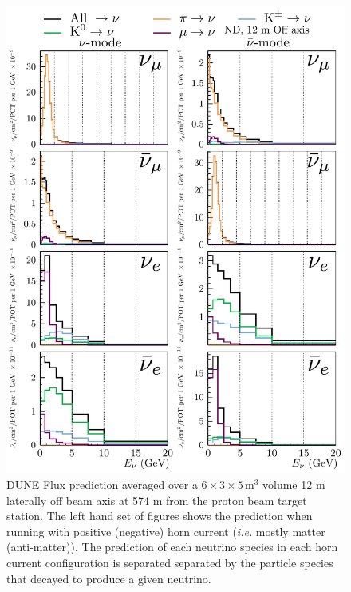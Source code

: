 \documentclass{article}
\begin{document}
\begin{figure}
  \includegraphics[width=\textwidth]{plots/fluxpredcompvar/ND_HadronParentFluxComponents_12m_offaxis}
  \caption{DUNE Flux prediction averaged over a $6\times 3\times 5\,\textrm{m}^{3}$ volume 12 m laterally off beam axis at 574 m from the proton beam target station. The left hand set of figures shows the prediction when running with positive (negative) horn current (\textit{i.e.} mostly matter (anti-matter)). The prediction of each neutrino species in each horn current configuration is separated separated by the particle species that decayed to produce a given neutrino.}
\end{figure}
\end{document}
